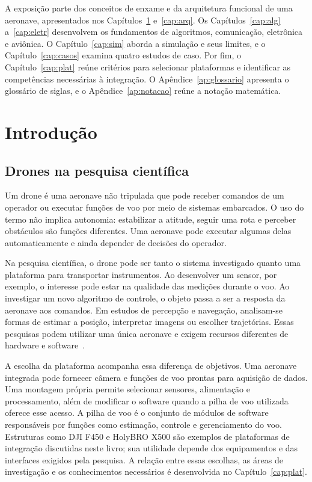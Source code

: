 \documentclass[11pt,a4paper,oneside]{book}
\numberwithin{equation}{chapter}
\begin{document}
A exposição parte dos conceitos de enxame e da arquitetura funcional de uma aeronave, apresentados nos Capítulos~\ref{cap:intro} e~\ref{cap:arq}. Os Capítulos~\ref{cap:alg} a~\ref{cap:eletr} desenvolvem os fundamentos de algoritmos, comunicação, eletrônica e aviônica. O Capítulo~\ref{cap:sim} aborda a simulação e seus limites, e o Capítulo~\ref{cap:casos} examina quatro estudos de caso. Por fim, o Capítulo~\ref{cap:plat} reúne critérios para selecionar plataformas e identificar as competências necessárias à integração. O Apêndice~\ref{ap:glossario} apresenta o glossário de siglas, e o Apêndice~\ref{ap:notacao} reúne a notação matemática.

\tableofcontents
\listoffigures
\listoftables

\mainmatter

\chapter{Introdução}\label{cap:intro}
\section{Drones na pesquisa científica}\label{sec:drones-pesquisa}
Um drone é uma aeronave não tripulada que pode receber comandos de um operador ou executar funções de voo por meio de sistemas embarcados. O uso do termo não implica autonomia: estabilizar a atitude, seguir uma rota e perceber obstáculos são funções diferentes. Uma aeronave pode executar algumas delas automaticamente e ainda depender de decisões do operador.

Na pesquisa científica, o drone pode ser tanto o sistema investigado quanto uma plataforma para transportar instrumentos. Ao desenvolver um sensor, por exemplo, o interesse pode estar na qualidade das medições durante o voo. Ao investigar um novo algoritmo de controle, o objeto passa a ser a resposta da aeronave aos comandos. Em estudos de percepção e navegação, analisam-se formas de estimar a posição, interpretar imagens ou escolher trajetórias. Essas pesquisas podem utilizar uma única aeronave e exigem recursos diferentes de hardware e software~\cite{controle,companion,px4payloads}.

A escolha da plataforma acompanha essa diferença de objetivos. Uma aeronave integrada pode fornecer câmera e funções de voo prontas para aquisição de dados. Uma montagem própria permite selecionar sensores, alimentação e processamento, além de modificar o software quando a pilha de voo utilizada oferece esse acesso. A pilha de voo é o conjunto de módulos de software responsáveis por funções como estimação, controle e gerenciamento do voo. Estruturas como DJI F450 e HolyBRO X500 são exemplos de plataformas de integração discutidas neste livro; sua utilidade depende dos equipamentos e das interfaces exigidos pela pesquisa. A relação entre essas escolhas, as áreas de investigação e os conhecimentos necessários é desenvolvida no Capítulo~\ref{cap:plat}.
\end{document}
